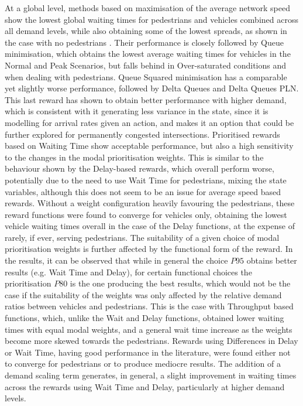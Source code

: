 \documentclass[a4paper, conference]{IEEEtran}
\begin{document}
At a global level, methods based on maximisation of the average network speed show the lowest global waiting times for pedestrians and vehicles combined across all demand levels, while also obtaining some of the lowest spreads, as shown in the case with no pedestrians \cite{previous}.
Their performance is closely followed by Queue minimisation, which obtains the lowest average waiting times for vehicles in the Normal and Peak Scenarios, but falls behind in Over-saturated conditions and when dealing with pedestrians.
Queue Squared minimisation has a comparable yet slightly worse performance, followed by Delta Queues and Delta Queues PLN.
This last reward has shown to obtain better performance with higher demand, which is consistent with it generating less variance in the state, since it is modelling for arrival rates given an action, and makes it an option that could be further explored for permanently congested intersections.
Prioritised rewards based on Waiting Time show acceptable performance, but also a high sensitivity to the changes in the modal prioritisation weights. 
This is similar to the behaviour shown by the Delay-based rewards, which overall perform worse, potentially due to the need to use Wait Time for pedestrians, mixing the state variables, although this does not seem to be an issue for average speed based rewards.
Without a weight configuration heavily favouring the pedestrians, these reward functions were found to converge for vehicles only, obtaining the lowest vehicle waiting times overall in the case of the Delay functions, at the expense of rarely, if ever, serving pedestrians.
The suitability of a given choice of modal prioritisation weights is further affected by the functional form of the reward.
In the results, it can be observed that while in general the choice $P95$ obtains better results (e.g. Wait Time and Delay), for certain functional choices the prioritisation $P80$ is the one producing the best results, which would not be the case if the suitability of the weights was only affected by the relative demand ratios between vehicles and pedestrians. 
This is the case with Throughput based functions, which, unlike the Wait and Delay functions, obtained lower waiting times with equal modal weights, and a general wait time increase as the weights become more skewed towards the pedestrians.
Rewards using Differences in Delay or Wait Time, having good performance in the literature, were found either not to converge for pedestrians or to produce mediocre results.
The addition of a demand scaling term generates, in general, a slight improvement in waiting times across the rewards using Wait Time and Delay, particularly at higher demand levels. 
\end{document}
